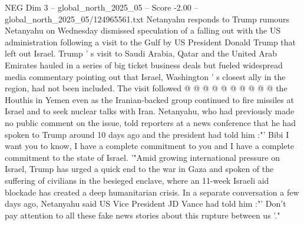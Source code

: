 \begin{textsample}{NEG Dim 3 – global\_north\_2025\_05 – Score -2.00 – global\_north\_2025\_05/124965561.txt}
Netanyahu responds to Trump rumours Netanyahu on Wednesday dismissed speculation of a falling out with the US administration following a visit to the Gulf by US President Donald Trump that left out Israel.
Trump ' s visit to Saudi Arabia, Qatar and the United Arab Emirates hauled in a series of big ticket business deals but fueled widespread media commentary pointing out that Israel, Washington ' s closest ally in the region, had not been included.
The visit followed @ @ @ @ @ @ @ @ @ @ the Houthis in Yemen even as the Iranian-backed group continued to fire missiles at Israel and to seek nuclear talks with Iran.
Netanyahu, who had previously made no public comment on the issue, told reporters at a news conference that he had spoken to Trump around 10 days ago and the president had told him :"' Bibi I want you to know, I have a complete commitment to you and I have a complete commitment to the state of Israel. '"Amid growing international pressure on Israel, Trump has urged a quick end to the war in Gaza and spoken of the suffering of civilians in the besieged enclave, where an 11-week Israeli aid blockade has created a deep humanitarian crisis.
In a separate conversation a few days ago, Netanyahu said US Vice President JD Vance had told him :"' Don't pay attention to all these fake news stories about this rupture between us '."

\end{textsample}
